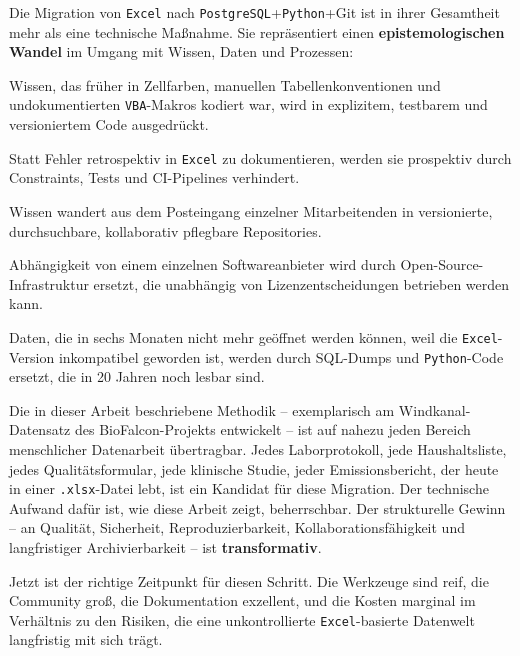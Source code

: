 \documentclass[12pt,a4paper]{report}
\theoremstyle{definition}
\theoremstyle{remark}
\newcommand{\excel}{\texttt{Excel}}
\newcommand{\vba}{\texttt{VBA}}
\newcommand{\pg}{\texttt{PostgreSQL}}
\newcommand{\py}{\texttt{Python}}
\newcommand{\code}[1]{\texttt{#1}}
\begin{document}
Die Migration von \excel{} nach \pg{}+\py{}+Git ist in ihrer Gesamtheit
mehr als eine technische Maßnahme.
Sie repräsentiert einen \textbf{epistemologischen Wandel} im Umgang
mit Wissen, Daten und Prozessen:

\begin{description}[leftmargin=2em, itemsep=6pt]
  \item[\textbf{Von implizit zu explizit:}]
        Wissen, das früher in Zellfarben, manuellen
        Tabellenkonventionen und undokumentierten \vba-Makros
        kodiert war, wird in explizitem, testbarem und
        versioniertem Code ausgedrückt.
  \item[\textbf{Von reaktiv zu prädiktiv:}]
        Statt Fehler retrospektiv in \excel{} zu dokumentieren,
        werden sie prospektiv durch Constraints, Tests und
        CI-Pipelines verhindert.
  \item[\textbf{Von silo-basiert zu kollaborativ:}]
        Wissen wandert aus dem Posteingang einzelner Mitarbeitenden
        in versionierte, durchsuchbare, kollaborativ pflegbare
        Repositories.
  \item[\textbf{Von proprietär zu souverän:}]
        Abhängigkeit von einem einzelnen Softwareanbieter wird durch
        Open-Source-Infrastruktur ersetzt, die unabhängig von
        Lizenzentscheidungen betrieben werden kann.
  \item[\textbf{Von ephemer zu archivierbar:}]
        Daten, die in sechs Monaten nicht mehr geöffnet werden können,
        weil die \excel-Version inkompatibel geworden ist, werden durch
        SQL-Dumps und \py-Code ersetzt, die in 20 Jahren noch lesbar sind.
\end{description}

Die in dieser Arbeit beschriebene Methodik -- exemplarisch am
Windkanal-Datensatz des BioFalcon-Projekts entwickelt -- ist auf
nahezu jeden Bereich menschlicher Datenarbeit übertragbar.
Jedes Laborprotokoll, jede Haushaltsliste, jedes Qualitätsformular,
jede klinische Studie, jeder Emissionsbericht, der heute in einer
\code{.xlsx}-Datei lebt, ist ein Kandidat für diese Migration.
Der technische Aufwand dafür ist, wie diese Arbeit zeigt, beherrschbar.
Der strukturelle Gewinn -- an Qualität, Sicherheit, Reproduzierbarkeit,
Kollaborationsfähigkeit und langfristiger Archivierbarkeit -- ist
\textbf{transformativ}.

\medskip

Jetzt ist der richtige Zeitpunkt für diesen Schritt.
Die Werkzeuge sind reif, die Community groß, die Dokumentation
exzellent, und die Kosten marginal im Verhältnis zu den Risiken,
die eine unkontrollierte \excel-basierte Datenwelt langfristig
mit sich trägt.
\end{document}
